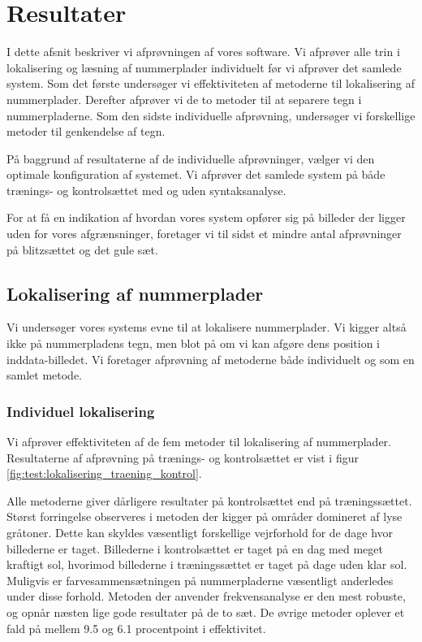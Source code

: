 \section{Resultater}
\label{sec:resultater}
I dette afsnit beskriver vi afprøvningen af vores software. Vi afprøver alle trin i lokalisering og læsning af nummerplader individuelt før vi afprøver det samlede system. Som det første undersøger vi effektiviteten af metoderne til lokalisering af nummerplader. Derefter afprøver vi de to metoder til at separere tegn i nummerpladerne. Som den sidste individuelle afprøvning, undersøger vi forskellige metoder til genkendelse af tegn.

På baggrund af resultaterne af de individuelle afprøvninger, vælger vi den optimale konfiguration af systemet. Vi afprøver det samlede system på både trænings- og kontrolsættet med og uden syntaksanalyse.

For at få en indikation af hvordan vores system opfører sig på billeder der ligger uden for vores afgrænsninger, foretager vi til sidst et mindre antal afprøvninger på blitzsættet og det gule sæt.


\subsection{Lokalisering af nummerplader}
Vi undersøger vores systems evne til at lokalisere nummerplader. Vi kigger altså ikke på nummerpladens tegn, men blot på om vi kan afgøre dens position i inddata-billedet. Vi foretager afprøvning af metoderne både individuelt og som en samlet metode.

\subsubsection{Individuel lokalisering}
Vi afprøver effektiviteten af de fem metoder til lokalisering af nummerplader. Resultaterne af afprøvning på trænings- og kontrolsættet er vist i figur \vref{fig:test:lokalisering_traening_kontrol}.

Alle metoderne giver dårligere resultater på kontrolsættet end på træningssættet. Størst forringelse observeres i metoden der kigger på områder domineret af lyse gråtoner. Dette kan skyldes væsentligt forskellige vejrforhold for de dage hvor billederne er taget. Billederne i kontrolsættet er taget på en dag med meget kraftigt sol, hvorimod billederne i træningssættet er taget på dage uden klar sol. Muligvis er farvesammensætningen på nummerpladerne væsentligt anderledes under disse forhold. Metoden der anvender frekvensanalyse er den mest robuste, og opnår næsten lige gode resultater på de to sæt. De øvrige metoder oplever et fald på mellem 9.5 og 6.1 procentpoint i effektivitet.

